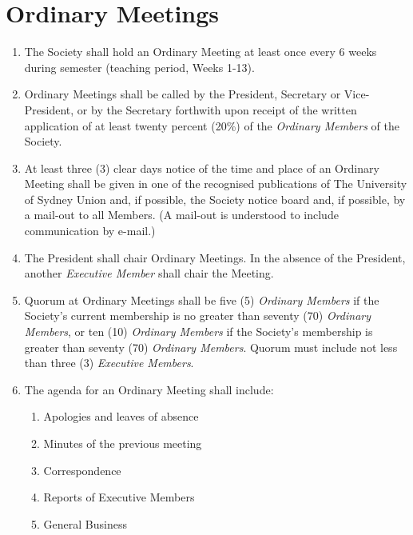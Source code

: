 \documentclass[11pt]{article}
\begin{document}
\section{Ordinary Meetings}
\begin{enumerate}[\thesection .1]
    \item The Society shall hold an Ordinary Meeting at least once every 6 weeks during semester (teaching period, Weeks 1-13).
    \item Ordinary Meetings shall be called by the President, Secretary or Vice-President, or by the Secretary forthwith upon receipt of the written application of at least twenty percent (20\%) of the \textit{Ordinary Members} of the Society.
    \item At least three (3) clear days notice of the time and place of an Ordinary Meeting shall be given in one of the recognised publications of The University of Sydney Union and, if possible, the Society notice board and, if possible, by a mail-out to all Members. (A mail-out is understood to include communication by e-mail.)
    \item The President shall chair Ordinary Meetings. In the absence of the President, another \textit{Executive Member} shall chair the Meeting.
    \item Quorum at Ordinary Meetings shall be five (5) \textit{Ordinary Members} if the Society’s current membership is no greater than seventy (70) \textit{Ordinary Members}, or ten (10) \textit{Ordinary Members} if the Society’s membership is greater than seventy (70) \textit{Ordinary Members}. Quorum must include not less than three (3) \textit{Executive Members}.
    \item The agenda for an Ordinary Meeting shall include:
    \begin{enumerate}[\hspace{5mm}1.]
        \item Apologies and leaves of absence
        \item Minutes of the previous meeting
        \item Correspondence
        \item Reports of Executive Members
        \item General Business
    \end{enumerate}
    

\end{enumerate}
\end{document}
